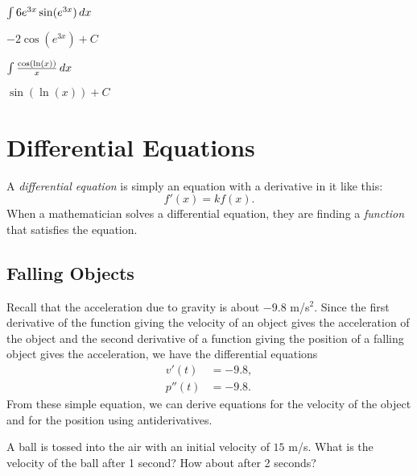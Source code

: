\begin{exercises}
\begin{multicols}{2}
\begin{exercise}
$\int 6e^{3x} \sin(e^{3x}) \, d x$   
\begin{answer}
$-2\cos(e^{3x})+C$
\end{answer}
\end{exercise}

\begin{exercise}
$\int \frac{\cos(\ln(x))}{x} \, d x$ 
\begin{answer}
$\sin(\ln(x)) + C$
\end{answer}
\end{exercise}
\end{multicols}
\end{exercises}















\section{Differential Equations}

A \textit{differential equation} is
simply an equation with a derivative in it like this:
\[
f'(x) = k f(x).
\]
When a mathematician solves a differential equation, they are finding
a \textit{function} that satisfies the equation.

\subsection*{Falling Objects}

Recall that the acceleration due to gravity is about $-9.8$
m/s$^2$. Since the first derivative of the function giving the
velocity of an object gives the acceleration of the object and the
second derivative of a function giving the position of a falling
object gives the acceleration, we have the differential equations
\begin{align*}
v'(t) &=  -9.8,\\
p''(t) &=  -9.8.
\end{align*}
From these simple equation, we can derive equations for the velocity of
the object and for the position using antiderivatives.


\begin{example}
A ball is tossed into the air with an initial velocity of $15$
m/s. What is the velocity of the ball after 1 second? How about after
2 seconds?
\end{example}

